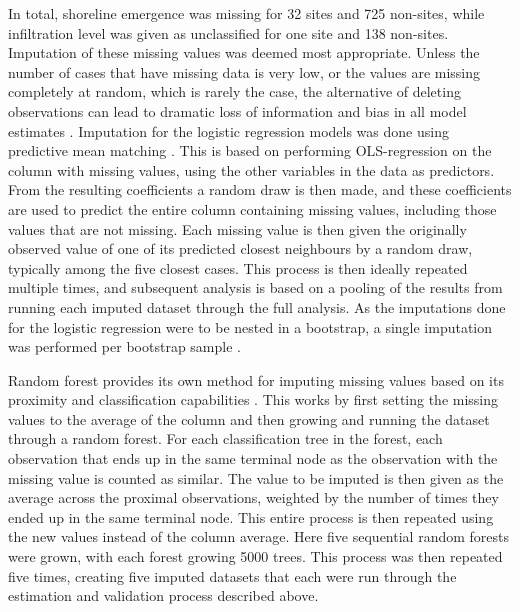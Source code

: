 \documentclass[12pt, a4paper]{article}
\begin{document}
In total, shoreline emergence was missing for 32 sites and 725 non-sites, while infiltration level was given as unclassified for one site and 138 non-sites. Imputation of these missing values was deemed most appropriate. Unless the number of cases that have missing data is very low, or the values are missing completely at random, which is rarely the case, the alternative of deleting observations can lead to dramatic loss of information and bias in all model estimates \citep[][]{nakagawa2008}. Imputation for the logistic regression models was done using predictive mean matching \citep{buuren2011}. This is based on performing OLS-regression on the column with missing values, using the other variables in the data as predictors. From the resulting coefficients a random draw is then made, and these coefficients are used to predict the entire column containing missing values, including those values that are not missing. Each missing value is then given the originally observed value of one of its predicted closest neighbours by a random draw, typically among the five closest cases. This process is then ideally repeated multiple times, and subsequent analysis is based on a pooling of the results from running each imputed dataset through the full analysis. As the imputations done for the logistic regression were to be nested in a bootstrap, a single imputation was performed per bootstrap sample \citep{brand2018}. \par
Random forest provides its own method for imputing missing values based on its proximity and classification capabilities \citep{breiman2003}. This works by first setting the missing values to the average of the column and then growing and running the dataset through a random forest. For each classification tree in the forest, each observation that ends up in the same terminal node as the observation with the missing value is counted as similar. The value to be imputed is then given as the average across the proximal observations, weighted by the number of times they ended up in the same terminal node. This entire process is then repeated using the new values instead of the column average. Here five sequential random forests were grown, with each forest growing 5000 trees. This process was then repeated five times, creating five imputed datasets that each were run through the estimation and validation process described above.\par 
\end{document}
